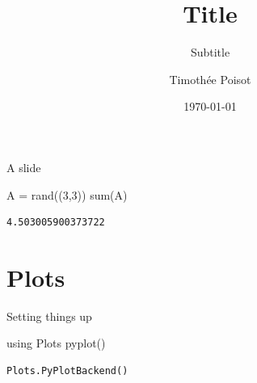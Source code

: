 \documentclass[11pt, compress, aspectratio=1610, serif]{beamer}
\title{Title}
\subtitle{Subtitle}
\date{\today}
\author{Timothée Poisot}
\institute{Université de Montréal}
\newenvironment{Shaded}{}{}
\newcommand{\FloatTok}[1]{\textcolor[rgb]{0.25,0.63,0.44}{{#1}}}
\newcommand{\NormalTok}[1]{{#1}}
\begin{document}
\maketitle

\begin{frame}[fragile]{A slide}

\begin{Shaded}
\begin{Highlighting}[]
\NormalTok{A = rand((}\FloatTok{3}\NormalTok{,}\FloatTok{3}\NormalTok{))}
\NormalTok{sum(A)}
\end{Highlighting}
\end{Shaded}

\begin{verbatim}
4.503005900373722
\end{verbatim}

\end{frame}

\section{Plots}\label{plots}

\begin{frame}[fragile]{Setting things up}

\begin{Shaded}
\begin{Highlighting}[]
\NormalTok{using Plots}
\NormalTok{pyplot()}
\end{Highlighting}
\end{Shaded}

\begin{verbatim}
Plots.PyPlotBackend()
\end{verbatim}

\end{frame}
\end{document}
